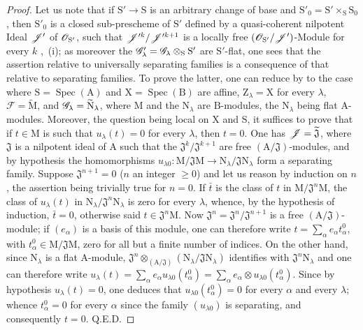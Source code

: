\begin{proof}
Let us note that if $\mathrm{S}'\to\mathrm{S}$ is an arbitrary change of base and $\mathrm{S}'_0=\mathrm{S}'\times_\mathrm{S}\mathrm{S}_0$, then $\mathrm{S}'_0$ is a closed sub-prescheme of $\mathrm{S}'$ defined by a quasi-coherent nilpotent Ideal $\mathscr{J}'$ of $\mathscr{O}_{\mathrm{S}'}$, such that $\mathscr{J}'^k/\mathscr{J}'^{k+1}$ is a locally free $(\mathscr{O}_{\mathrm{S}'}/\mathscr{J}')$-Module for every $k$ ,~(i); as moreover the $\mathscr{G}'_\lambda=\mathscr{G}_\lambda\otimes_\mathrm{S}\mathrm{S}'$ are $\mathrm{S}'$-flat, one sees that the assertion relative to universally separating families is a consequence of that relative to separating families.
To prove the latter, one can reduce by  to the case where $\mathrm{S}=\operatorname{Spec}(\mathrm{A})$ and $\mathrm{X}=\operatorname{Spec}(\mathrm{B})$ are affine, $\mathrm{Z}_\lambda=\mathrm{X}$ for every $\lambda$, $\mathscr{F}=\widetilde{\mathrm{M}}$, and $\mathscr{G}_\lambda=\widetilde{\mathrm{N}}_\lambda$, where $\mathrm{M}$ and the $\mathrm{N}_\lambda$ are $\mathrm{B}$-modules, the $\mathrm{N}_\lambda$ being flat $\mathrm{A}$-modules.
Moreover, the question being local on $\mathrm{X}$ and $\mathrm{S}$, it suffices to prove that if $t\in\mathrm{M}$ is such that $u_\lambda(t)=0$ for every $\lambda$, then $t=0$.
One has $\mathscr{J}=\widetilde{\mathfrak{J}}$, where $\mathfrak{J}$ is a nilpotent ideal of $\mathrm{A}$ such that the $\mathfrak{J}^k/\mathfrak{J}^{k+1}$ are free $(\mathrm{A}/\mathfrak{J})$-modules, and by hypothesis the homomorphisms $u_{\lambda 0}:\mathrm{M}/\mathfrak{J}\mathrm{M}\to\mathrm{N}_\lambda/\mathfrak{J}\mathrm{N}_\lambda$ form a separating family.
Suppose $\mathfrak{J}^{n+1}=0$ ($n$ an integer $\geq 0$) and let us reason by induction on $n$, the assertion being trivially true for $n=0$.
If $\bar{t}$ is the class of $t$ in $\mathrm{M}/\mathfrak{J}^n\mathrm{M}$, the class of $u_\lambda(t)$ in $\mathrm{N}_\lambda/\mathfrak{J}^n\mathrm{N}_\lambda$ is zero for every $\lambda$, whence, by the hypothesis of induction, $\bar{t}=0$, otherwise said $t\in\mathfrak{J}^n\mathrm{M}$.
Now $\mathfrak{J}^n=\mathfrak{J}^n/\mathfrak{J}^{n+1}$ is a free $(\mathrm{A}/\mathfrak{J})$-module; if $(e_\alpha)$ is a basis of this module, one can therefore write $t=\sum_\alpha e_\alpha t_\alpha^0$, with $t_\alpha^0\in\mathrm{M}/\mathfrak{J}\mathrm{M}$, zero for all but a finite number of indices.
On the other hand, since $\mathrm{N}_\lambda$ is a flat $\mathrm{A}$-module, $\mathfrak{J}^n\otimes_{(\mathrm{A}/\mathfrak{J})}(\mathrm{N}_\lambda/\mathfrak{J}\mathrm{N}_\lambda)$ identifies with $\mathfrak{J}^n\mathrm{N}_\lambda$ and one can therefore write $u_\lambda(t)=\sum_\alpha e_\alpha u_{\lambda 0}(t_\alpha^0)=\sum_\alpha e_\alpha\otimes u_{\lambda 0}(t_\alpha^0)$.
Since by hypothesis $u_\lambda(t)=0$, one deduces that $u_{\lambda 0}(t_\alpha^0)=0$ for every $\alpha$ and every $\lambda$; whence $t_\alpha^0=0$ for every $\alpha$ since the family $(u_{\lambda 0})$ is separating, and consequently $t=0$. Q.E.D.
\end{proof}

